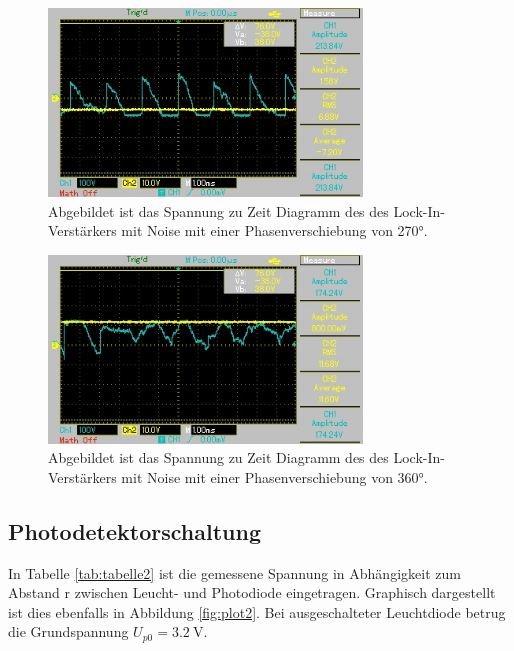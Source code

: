 \begin{figure}[H]
  \centering
  \includegraphics[height=5cm]{Bilder/n_phi270.jpg}
  \caption{Abgebildet ist das Spannung zu Zeit Diagramm des des Lock-In-Verstärkers mit Noise mit einer Phasenverschiebung von 270°.}
  \label{fig:n_phi270}
\end{figure}

\begin{figure}[H]
  \centering
  \includegraphics[height=5cm]{Bilder/n_phi360.jpg}
  \caption{Abgebildet ist das Spannung zu Zeit Diagramm des des Lock-In-Verstärkers mit Noise mit einer Phasenverschiebung von 360°.}
  \label{fig:n_phi360}
\end{figure}

\subsection{Photodetektorschaltung}
In Tabelle \ref{tab:tabelle2} ist die gemessene Spannung in Abhängigkeit zum Abstand r zwischen Leucht- und Photodiode eingetragen.
Graphisch dargestellt ist dies ebenfalls in Abbildung \ref{fig:plot2}.
Bei ausgeschalteter Leuchtdiode betrug die Grundspannung $U_{p0}=\qty{3.2}{\volt}$.

